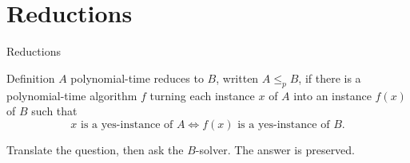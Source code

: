 \documentclass[10pt,aspectratio=169]{beamer}
\begin{document}
\section{Reductions}

\begin{frame}{Reductions}
  \begin{block}{Definition}
    $A$ \alert{polynomial-time reduces} to $B$, written $A \le_p B$, if there
    is a polynomial-time algorithm $f$ turning each instance $x$ of $A$ into
    an instance $f(x)$ of $B$ such that
    \[
      x \text{ is a yes-instance of } A \iff f(x) \text{ is a yes-instance of
      } B.
    \]
  \end{block}

  \begin{center}
  \end{center}

  Translate the question, then ask the $B$-solver. The answer is preserved.
\end{frame}
\end{document}
